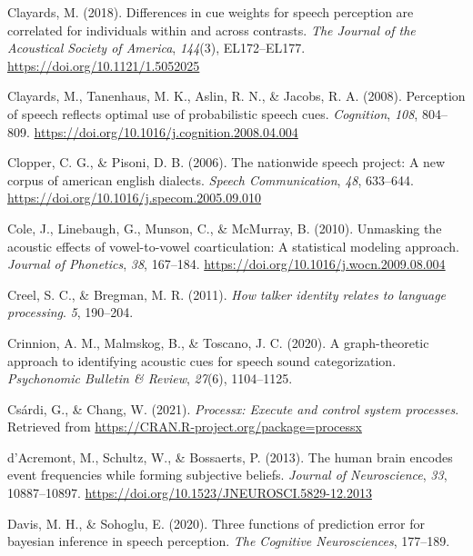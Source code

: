 \documentclass[
  11pt,
  english,
  man,floatsintext]{apa6}
\newlength{\cslhangindent}
\newlength{\cslentryspacingunit} %
\newenvironment{CSLReferences}[2] %
 {%
  \setlength{\parindent}{0pt}
  \ifodd #1
  \let\oldpar\par
  \def\par{\hangindent=\cslhangindent\oldpar}
  \fi
  \setlength{\parskip}{#2\cslentryspacingunit}
 }%
 {}
\begin{document}
\begin{CSLReferences}{1}{0}
\leavevmode{}%
Clayards, M. (2018). Differences in cue weights for speech perception are correlated for individuals within and across contrasts. \emph{The Journal of the Acoustical Society of America}, \emph{144}(3), EL172--EL177. \url{https://doi.org/10.1121/1.5052025}

\leavevmode{}%
Clayards, M., Tanenhaus, M. K., Aslin, R. N., \& Jacobs, R. A. (2008). Perception of speech reflects optimal use of probabilistic speech cues. \emph{Cognition}, \emph{108}, 804--809. \url{https://doi.org/10.1016/j.cognition.2008.04.004}

\leavevmode{}%
Clopper, C. G., \& Pisoni, D. B. (2006). The nationwide speech project: A new corpus of american english dialects. \emph{Speech Communication}, \emph{48}, 633--644. \url{https://doi.org/10.1016/j.specom.2005.09.010}

\leavevmode{}%
Cole, J., Linebaugh, G., Munson, C., \& McMurray, B. (2010). Unmasking the acoustic effects of vowel-to-vowel coarticulation: A statistical modeling approach. \emph{Journal of Phonetics}, \emph{38}, 167--184. \url{https://doi.org/10.1016/j.wocn.2009.08.004}

\leavevmode{}%
Creel, S. C., \& Bregman, M. R. (2011). \emph{How talker identity relates to language processing}. \emph{5}, 190--204.

\leavevmode{}%
Crinnion, A. M., Malmskog, B., \& Toscano, J. C. (2020). A graph-theoretic approach to identifying acoustic cues for speech sound categorization. \emph{Psychonomic Bulletin \& Review}, \emph{27}(6), 1104--1125.

\leavevmode{}%
Csárdi, G., \& Chang, W. (2021). \emph{Processx: Execute and control system processes}. Retrieved from \url{https://CRAN.R-project.org/package=processx}

\leavevmode{}%
d'Acremont, M., Schultz, W., \& Bossaerts, P. (2013). The human brain encodes event frequencies while forming subjective beliefs. \emph{Journal of Neuroscience}, \emph{33}, 10887--10897. \url{https://doi.org/10.1523/JNEUROSCI.5829-12.2013}

\leavevmode{}%
Davis, M. H., \& Sohoglu, E. (2020). Three functions of prediction error for bayesian inference in speech perception. \emph{The Cognitive Neurosciences}, 177--189.


\end{CSLReferences}
\end{document}
